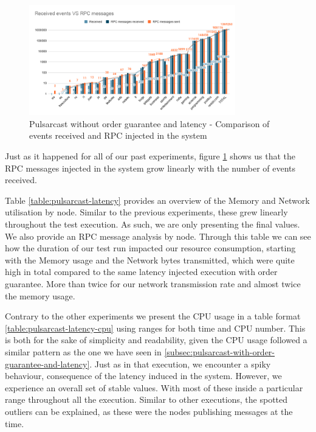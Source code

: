 \begin{figure}[!htb]
  \centering
  \includegraphics[width=0.8\textwidth]{img/graph-pulsarcast-latency-rpc.png}
  \caption{Pulsarcast without order guarantee and latency - Comparison of events received and RPC injected in the system}
  \label{fig:graph-pulsarcast-latency-rpc}
\end{figure}

Just as it happened for all of our past experiments, figure
\ref{fig:graph-pulsarcast-latency-rpc} shows us that the RPC messages injected
in the system grow linearly with the number of events received.

Table \ref{table:pulsarcast-latency} provides an overview of the Memory and
Network utilisation by node. Similar to the previous experiments, these grew
linearly throughout the test execution. As such, we are only presenting the
final values. We also provide an RPC message analysis by node. Through this
table we can see how the duration of our test run impacted our resource
consumption, starting with the Memory usage and the Network bytes transmitted,
which were quite high in total compared to the same latency injected execution
with order guarantee. More than twice for our network transmission rate and
almost twice the memory usage.

Contrary to the other experiments we present the CPU usage in a table format
\ref{table:pulsarcast-latency-cpu} using ranges for both time and CPU number.
This is both for the sake of simplicity and readability, given the CPU usage
followed a similar pattern as the one we have seen in
\ref{subsec:pulsarcast-with-order-guarantee-and-latency}. Just as in that
execution, we encounter a spiky behaviour, consequence of the latency induced
in the system. However, we experience an overall set of stable values. With
most of these inside a particular range throughout all the execution. Similar
to other executions, the spotted outliers can be explained, as these were the
nodes publishing messages at the time.

